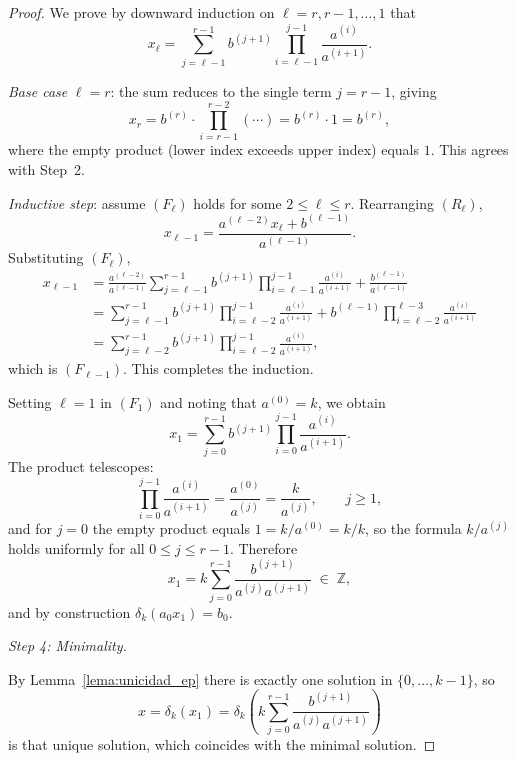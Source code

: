 \documentclass[10pt,a4paper]{amsart}
\begin{document}
\begin{proof}
We prove by downward induction on $\ell = r, r-1, \dots, 1$ that
\[
x_\ell
=
\sum_{j=\ell-1}^{r-1}
b^{(j+1)}
\prod_{i=\ell-1}^{j-1}
\frac{a^{(i)}}{a^{(i+1)}}.
\tag{$F_\ell$}
\]

\textit{Base case} $\ell = r$: the sum reduces to the single term
$j = r-1$, giving
\[
x_r = b^{(r)} \cdot \prod_{i=r-1}^{r-2}(\cdots) = b^{(r)} \cdot 1 = b^{(r)},
\]
where the empty product (lower index exceeds upper index) equals $1$.
This agrees with Step~2.

\textit{Inductive step}: assume $(F_\ell)$ holds for some
$2 \le \ell \le r$.
Rearranging $(R_\ell)$,
\[
x_{\ell-1}
=
\frac{a^{(\ell-2)} x_\ell + b^{(\ell-1)}}{a^{(\ell-1)}}.
\]
Substituting $(F_\ell)$,
\begin{align*}
x_{\ell-1}
&=
\frac{a^{(\ell-2)}}{a^{(\ell-1)}}
\sum_{j=\ell-1}^{r-1}
b^{(j+1)}
\prod_{i=\ell-1}^{j-1}
\frac{a^{(i)}}{a^{(i+1)}}
+
\frac{b^{(\ell-1)}}{a^{(\ell-1)}}
\\
&=
\sum_{j=\ell-1}^{r-1}
b^{(j+1)}
\prod_{i=\ell-2}^{j-1}
\frac{a^{(i)}}{a^{(i+1)}}
+
b^{(\ell-1)}
\prod_{i=\ell-2}^{\ell-3}
\frac{a^{(i)}}{a^{(i+1)}}
\\
&=
\sum_{j=\ell-2}^{r-1}
b^{(j+1)}
\prod_{i=\ell-2}^{j-1}
\frac{a^{(i)}}{a^{(i+1)}},
\end{align*}
which is $(F_{\ell-1})$. This completes the induction.

Setting $\ell = 1$ in $(F_1)$ and noting that $a^{(0)} = k$, we obtain
\[
x_1
=
\sum_{j=0}^{r-1}
b^{(j+1)}
\prod_{i=0}^{j-1}
\frac{a^{(i)}}{a^{(i+1)}}.
\]
The product telescopes:
\[
\prod_{i=0}^{j-1}
\frac{a^{(i)}}{a^{(i+1)}}
=
\frac{a^{(0)}}{a^{(j)}}
=
\frac{k}{a^{(j)}},
\qquad j \ge 1,
\]
and for $j = 0$ the empty product equals $1 = k/a^{(0)} = k/k$,
so the formula $k/a^{(j)}$ holds uniformly for all $0 \le j \le r-1$.
Therefore
\[
x_1
=
k \sum_{j=0}^{r-1}
\frac{b^{(j+1)}}{a^{(j)} a^{(j+1)}}
\;\in\; \mathbb{Z},
\]
and by construction $\delta_k(a_0 x_1) = b_0$.

\medskip
\textit{Step 4: Minimality.}

By Lemma~\ref{lema:unicidad_ep} there is exactly one solution in
$\{0,\dots,k-1\}$, so
\[
x = \delta_k(x_1)
=
\delta_k\!\left(
k\sum_{j=0}^{r-1}
\frac{b^{(j+1)}}{a^{(j)}a^{(j+1)}}
\right)
\]
is that unique solution, which coincides with the minimal solution.
\end{proof}
\end{document}
